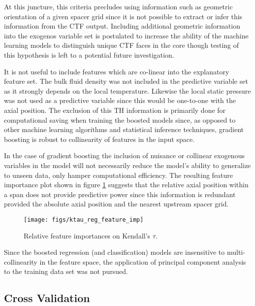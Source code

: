 
At this juncture, this criteria precludes using information such as geometric orientation of a given spacer grid since it is not possible to extract or infer this information from the CTF output.  Including additional geometric information into the exogenos variable set is postulated to increase the ability of the machine learning models to distinguish unique CTF faces in the core though testing of this hypothesis is left to a potential future investigation.

It is not useful to include features which are co-linear into the explanatory feature set. The bulk fluid density was not included in the predictive variable set as it strongly depends on the local temperature. Likewise the local static pressure was not used as a predictive variable since this would be one-to-one with the axial position.  The exclusion of this TH information is primarily done for computational saving when training the boosted models since, as opposed to other machine learning algorithms and statistical inference techniques, gradient boosting is robust to collinearity of features in the input space.

In the case of gradient boosting the inclusion of nuisance or collinear exogenous variables in the model will not necessarily reduce the model's ability to generalize to unseen data, only hamper computational efficiency.  The resulting feature importance plot shown in figure \ref{fig:ktauregfeatureimp} suggests that the relative axial position within a span does not provide predictive power since this information is redundant provided the absolute axial position and the nearest upstream spacer grid.

\begin{figure}[H]
    \centering
    \texttt{[image: figs/ktau\_reg\_feature\_imp]}
    \caption[Relative feature importance.]{Relative feature importances on Kendall's $\tau$.}
    \label{fig:ktauregfeatureimp}
\end{figure}

Since the boosted regression (and classification) models are insensitive to multi-collinearity in the feature space, the application of principal component analysis to the training data set was not pursued.


\subsection{Cross Validation}

